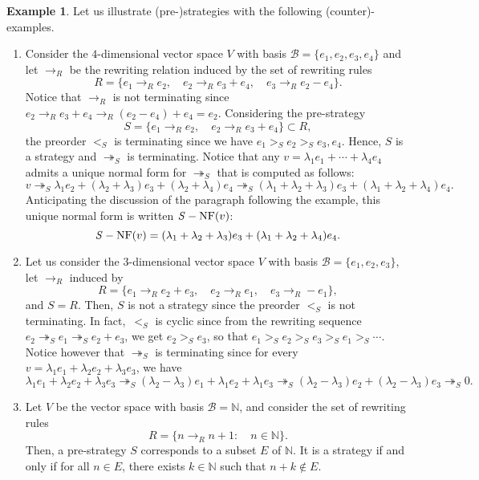 \documentclass[11pt]{article}
\theoremstyle{definition}
\newtheorem{example}[theorem]{Example}
\newcommand\basis{\mathscr{B}}
\newcommand\ordS{<_S}
\newcommand\N{\mathbb{N}}
\newcommand\rewR{\to_R}
\newcommand\parS{\twoheadrightarrow_S}
\DeclareMathOperator{\SNF}{{\it S}-NF}
\begin{document}
\begin{example}\label{ex:strategies_step_1}
  Let us illustrate (pre-)strategies with the following
  (counter)-examples.
  \begin{enumerate}
  \item\label{it:ex_strat_1} Consider the $4$-dimensional vector space
    $V$ with basis $\basis=\{e_1,e_2,e_3,e_4\}$ and let $\rewR$ be the
    rewriting relation induced by the set of rewriting rules
    \[R=\{e_1\rewR e_2,\quad e_2\rewR e_3+e_4,\quad e_3\rewR e_2-e_4\}.\]
    Notice that $\rewR$ is not terminating since
    $e_2\rewR e_3+e_4\rewR(e_2-e_4)+e_4=e_2$. Considering the
    pre-strategy
    \[S=\{e_1\rewR e_2,\quad e_2\rewR e_3+e_4\}\subset R,\]
    the preorder $\ordS$ is terminating since we have
    $e_1>_Se_2>_Se_3,e_4$. Hence, $S$ is a strategy and $\parS$ is
    terminating. Notice that any $v=\lambda_1e_1+\cdots+\lambda_4e_4$ 
    admits a unique normal form for $\parS$ that is computed as follows:
    \[v\parS\lambda_1e_2+(\lambda_2+\lambda_3)e_3+
    (\lambda_2+\lambda_4)e_4\parS(\lambda_1+\lambda_2+\lambda_3)e_3+
    (\lambda_1+\lambda_2+\lambda_4)e_4.\]
    Anticipating the discussion of the paragraph following the example,
    this unique normal form is written $\SNF(v)$:
    \[\SNF(v)=(\lambda_1+\lambda_2+\lambda_3)e_3+
    (\lambda_1+\lambda_2+\lambda_4)e_4.\]
  \item\label{it:c-ex_strat_1} Let us consider the $3$-dimensional vector
    space $V$ with basis $\basis=\{e_1,e_2,e_3\}$, let $\rewR$ induced by
    \[R=\{e_1\rewR e_2+e_3,\quad e_2\rewR e_1,\quad e_3\rewR -e_1\},\]
    and $S=R$. Then, $S$ is not a strategy since the preorder $\ordS$ is
    not terminating. In fact,~$\ordS$ is cyclic since from the rewriting
    sequence $e_2\parS e_1\parS e_2+e_3$, we get $e_2>_Se_3$, so that
    $e_1>_S e_2>_S e_3>_S e_1>_S\cdots$. Notice however that $\parS$ is
    terminating since for every
    $v=\lambda_1e_1+\lambda_2e_2+\lambda_3e_3$, we have
    \[\lambda_1e_1+\lambda_2e_2+\lambda_3e_3\parS(\lambda_2-\lambda_3)e_1
    +\lambda_1e_2+\lambda_1e_3\parS(\lambda_2-\lambda_3)e_2+(\lambda_2-
    \lambda_3)e_3\parS 0.
    \]
  \item\label{it:case_N} Let $V$ be the vector space with basis
    $\basis= \mathbb N$, and consider the set of rewriting rules
    \[R=\{n\rewR n+1:\quad n\in\N\}.\]
    Then, a pre-strategy $S$ corresponds to a subset $E$ of $\mathbb N$.
    It is a strategy if and only if for all $n \in E$, there exists
    $k \in \mathbb N$ such that $n + k \notin E$. 
  \end{enumerate}
\end{example}
\smallskip
\end{document}
